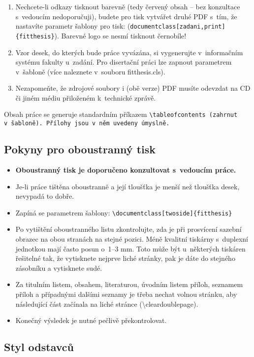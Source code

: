 \begin{enumerate}
  \item Nechcete-li odkazy tisknout barevně (tedy červený obsah -- bez konzultace s~vedoucím nedoporučuji), budete pro tisk vytvářet druhé PDF s~tím, že nastavíte parametr šablony pro tisk: (\verb|documentclass[zadani,print]{fitthesis}|).  Barevné logo se nesmí tisknout černobíle!
  \item Vzor desek, do kterých bude práce vyvázána, si vygenerujte v~informačním systému fakulty u~zadání. Pro disertační práci lze zapnout parametrem v~šabloně (více naleznete v~souboru fitthesis.cls).
  \item Nezapomeňte, že zdrojové soubory i (obě verze) PDF musíte odevzdat na CD či jiném médiu přiloženém k~technické zprávě.
\end{enumerate}

Obsah práce se generuje standardním příkazem \tt \textbackslash tableofcontents \rm (zahrnut v~šabloně). Přílohy jsou v~něm uvedeny úmyslně.

\subsection*{Pokyny pro oboustranný tisk}
\begin{itemize}
\item \textbf{Oboustranný tisk je doporučeno konzultovat s~vedoucím práce.}
\item Je-li práce tištěna oboustranně a její tloušťka je menší než tloušťka desek, nevypadá to dobře.
\item Zapíná se parametrem šablony: \verb|\documentclass[twoside]{fitthesis}|
\item Po vytištění oboustranného listu zkontrolujte, zda je při prosvícení sazební obrazec na obou stranách na stejné pozici. Méně kvalitní tiskárny s~duplexní jednotkou mají často posun o~1--3 mm. Toto může být u~některých tiskáren řešitelné tak, že vytisknete nejprve liché stránky, pak je dáte do stejného zásobníku a vytisknete sudé.
\item Za titulním listem, obsahem, literaturou, úvodním listem příloh, seznamem příloh a případnými dalšími seznamy je třeba nechat volnou stránku, aby následující část začínala na liché stránce (\textbackslash cleardoublepage).
\item  Konečný výsledek je nutné pečlivě překontrolovat.
\end{itemize}

\subsection*{Styl odstavců}

